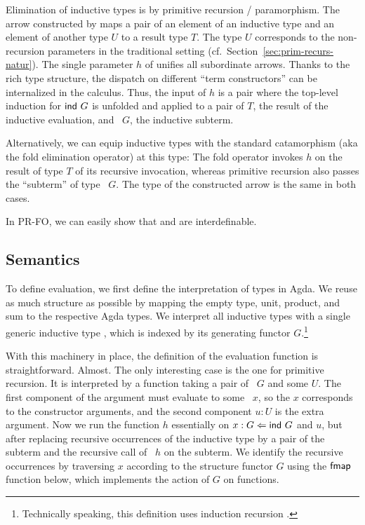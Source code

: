 \documentclass[a4paper,USenglish,cleveref, autoref, thm-restate]{lipics-v2021}
\begin{document}
Elimination of inductive types is by primitive recursion /
paramorphism. The arrow constructed by {\AP} maps a pair of an element
of an inductive type and an element of another type $U$ to a result type
$T$. The type $U$ corresponds to the non-recursion parameters in the
traditional setting (cf.\ Section~\ref{sec:prim-recurs-natur}). 
The single parameter $h$ of {\AP} unifies all subordinate
arrows. Thanks to the rich type structure, the dispatch on different
``term constructors'' can be internalized in the calculus. Thus, the
input of $h$ is a pair where the top-level induction for $\Aind\ G$ is
unfolded and applied to a pair of $T$, the result of the inductive
evaluation, and \Aind~$G$, the inductive subterm.

Alternatively, we can equip inductive types with the standard
catamorphism (aka the fold elimination operator) at this type:
\ccDataPRF
The fold operator invokes $h$ on the result of type $T$ of its
recursive invocation, whereas primitive recursion also passes the
``subterm'' of type \Aind~$G$. The type of the constructed arrow is
the same in both cases.

In PR-FO, we can easily show that {\AP} and {\AF} are interdefinable.

\subsection{Semantics}
\label{sec:semantics}


To define evaluation, we first define the interpretation of types in Agda.
\ccDataAlg
We reuse as much structure as possible by mapping the empty type, unit, product, and
sum to the respective Agda types. We interpret all inductive types with a
single generic inductive type , which is indexed by its generating
functor $G$.\footnote{Technically speaking, this definition uses
  induction recursion \cite{DBLP:journals/apal/DybjerS03}.}

With this machinery in place, the definition of the evaluation
function is straightforward. Almost.
\ccFunEval
The only interesting case is the one for primitive recursion. It is
interpreted by a function taking a pair of \Aind~$G$ and some $U$. The
first component of the argument must evaluate to some \Afold~$x$, so the $x$ corresponds
to the constructor arguments, and the second component $u:U$ is the
extra argument. Now we run the function $h$ essentially on
$x :{} G \Leftarrow \Aind~G$ and $u$, but 
after replacing recursive occurrences of the inductive type by a pair
of the subterm and the recursive call of {\AP}~$h$ on the subterm. We
identify the recursive occurrences by traversing $x$ according to the
structure functor $G$ using the $\Afmap$ function below, which
implements the action of $G$ on functions. 
\ccFunFmapSignature
\vspace{-1.5\baselineskip}
\ccFunFmap
\end{document}
